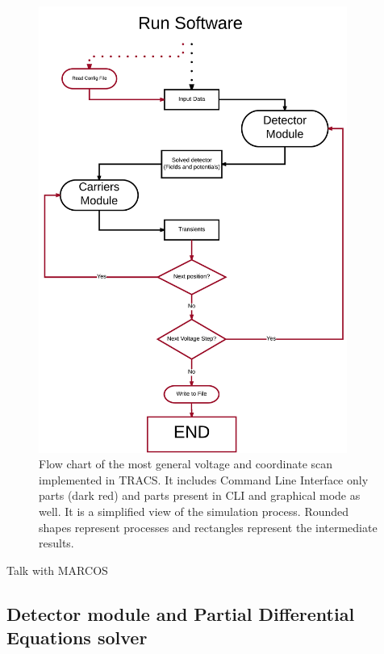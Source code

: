 \begin{figure}[H]
	\centering
	\includegraphics[width=0.9\textwidth]{TRACS_fc.png}
	\caption{Flow chart of the most general voltage and coordinate scan implemented in TRACS. It includes Command Line Interface only parts (dark red) and parts present in CLI and graphical mode as well. It is a simplified view of the simulation process. Rounded shapes represent processes and rectangles represent the intermediate results.}
	\label{fig:TRACS_fc}
\end{figure}

Talk with MARCOS %

\subsection{Detector module and Partial Differential Equations solver}

